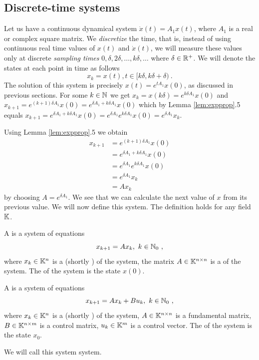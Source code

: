 \subsection{Discrete-time systems}

Let us have a continuous dynamical system $\dot{x}(t)=A_1x(t)$, where $A_1$ is a real or complex square matrix. We \textit{discretize} the time, that is, instead of using continuous real time values of $x(t)$ and $\dot{x}(t)$, we will measure these values only at discrete \textit{sampling times} $0,\delta,2\delta,\ldots,k\delta,\ldots$ where $\delta\in\mathbb{R}^+$. We will denote the states at each point in time as follows
$$x_k=x(t),t\in[k\delta,k\delta+\delta)\ .$$
The solution of this system is precisely $x(t)=e^{tA_1}x(0)$, as discussed in previous sections. For some $k\in\mathbb{N}$ we get $x_k=x(k\delta)=e^{k\delta A_1}x(0)$ and $x_{k+1}=e^{(k+1)\delta A_1}x(0)=e^{\delta A_1 +k\delta A_1}x(0)$ which by Lemma \ref{lem:expprop}.5 equals $x_{k+1}=e^{\delta A_1 +k\delta A_1}x(0)=e^{\delta A_1}e^{k\delta A_1}x(0)=e^{\delta A_1}x_k$.

Using Lemma \ref{lem:expprop}.5 we obtain 
\begin{align*}
	x_{k+1}
	&=e^{(k+1)\delta A_1}x(0) \\
	&=e^{\delta A_1 +k\delta A_1}x(0) \\
	&=e^{\delta A_1}e^{k\delta A_1}x(0) \\
	&=e^{\delta A_1}x_k \\
	&=Ax_k
\end{align*}
by choosing $A=e^{\delta A_1}$. We see that we can calculate the next value of $x$ from its previous value. We will now define this system. The definition holds for any field $\mathbb{K}$.

\begin{definition}
	A  is a system of equations
	$$x_{k+1}=Ax_k,\ k\in\mathbb{N}_0\ ,$$
	where $x_k\in \mathbb{K}^n$ is a  (shortly ) of the system, the matrix $A\in \mathbb{K}^{n\times n}$ is a  of the system. The  of the system is the state $x(0)$.
\end{definition}

\begin{definition}
	A  is a system of equations
	$$x_{k+1}=Ax_k+Bu_k,\ k\in\mathbb{N}_0\ ,$$
	where $x_k\in\mathbb{K}^n$ is a  (shortly ) of the system, $A\in\mathbb{K}^{n\times n}$ is a fundamental matrix, $B\in\mathbb{K}^{n\times m}$ is a control matrix, $u_k\in\mathbb{K}^m$ is a control vector. The  of the system is the state $x_0$.

	We will call this system  system.
\end{definition}


